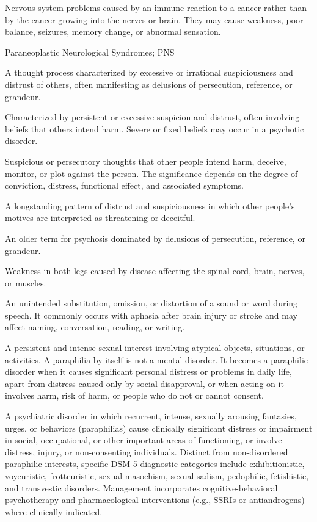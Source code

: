  Nervous-system problems caused by an immune reaction to a cancer rather than by the cancer growing into the nerves or brain. They may cause weakness, poor balance, seizures, memory change, or abnormal sensation.

\synonyms
Paraneoplastic Neurological Syndromes; PNS

 A thought process characterized by excessive or irrational suspiciousness and distrust
of others, often manifesting as delusions of persecution, reference, or grandeur.

 Characterized by persistent or excessive suspicion and distrust, often involving beliefs that others intend harm. Severe or fixed beliefs may occur in a psychotic disorder.

 Suspicious or persecutory thoughts that other people intend harm, deceive, monitor, or plot against the person. The significance depends on the degree of conviction, distress, functional effect, and associated symptoms.

 A longstanding pattern of distrust and suspiciousness in which other people’s motives are interpreted as threatening or deceitful.

 An older term for psychosis dominated by delusions of persecution, reference, or grandeur.

 Weakness in both legs caused by disease affecting the spinal cord, brain, nerves, or muscles.

 An unintended substitution, omission, or distortion of a sound or word during speech. It commonly occurs with aphasia after brain injury or stroke and may affect naming, conversation, reading, or writing.

 A persistent and intense sexual interest involving atypical objects, situations, or activities. A paraphilia by itself is not a mental disorder. It becomes a paraphilic disorder when it causes significant personal distress or problems in daily life, apart from distress caused only by social disapproval, or when acting on it involves harm, risk of harm, or people who do not or cannot consent.

 A psychiatric disorder in which recurrent, intense, sexually arousing fantasies, urges, or behaviors (paraphilias) cause clinically significant distress or impairment in social, occupational, or other important areas of functioning, or involve distress, injury, or non-consenting individuals. Distinct from non-disordered paraphilic interests, specific DSM-5 diagnostic categories include exhibitionistic, voyeuristic, frotteuristic, sexual masochism, sexual sadism, pedophilic, fetishistic, and transvestic disorders. Management incorporates cognitive-behavioral psychotherapy and pharmacological interventions (e.g., SSRIs or antiandrogens) where clinically indicated.


